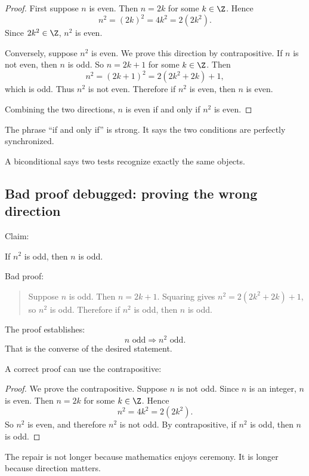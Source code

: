 \begin{proof}
First suppose $n$ is even. Then $n=2k$ for some $k\in\Z$. Hence
\[
n^2=(2k)^2=4k^2=2(2k^2).
\]
Since $2k^2\in\Z$, $n^2$ is even.

Conversely, suppose $n^2$ is even. We prove this direction by contrapositive. If $n$ is not even, then $n$ is odd. So $n=2k+1$ for some $k\in\Z$. Then
\[
n^2=(2k+1)^2=2(2k^2+2k)+1,
\]
which is odd. Thus $n^2$ is not even. Therefore if $n^2$ is even, then $n$ is even.

Combining the two directions, $n$ is even if and only if $n^2$ is even.
\end{proof}

The phrase ``if and only if'' is strong. It says the two conditions are perfectly synchronized.

\begin{intuitionbox}
A biconditional says two tests recognize exactly the same objects.
\end{intuitionbox}

\subsection{Bad proof debugged: proving the wrong direction}

Claim:

\begin{theorem}
If $n^2$ is odd, then $n$ is odd.
\end{theorem}

Bad proof:

\begin{quote}
Suppose $n$ is odd. Then $n=2k+1$. Squaring gives $n^2=2(2k^2+2k)+1$, so $n^2$ is odd. Therefore if $n^2$ is odd, then $n$ is odd.
\end{quote}

The proof establishes:
\[
n\text{ odd}\Rightarrow n^2\text{ odd}.
\]
That is the converse of the desired statement.

A correct proof can use the contrapositive:

\begin{proof}
We prove the contrapositive. Suppose $n$ is not odd. Since $n$ is an integer, $n$ is even. Then $n=2k$ for some $k\in\Z$. Hence
\[
n^2=4k^2=2(2k^2).
\]
So $n^2$ is even, and therefore $n^2$ is not odd. By contrapositive, if $n^2$ is odd, then $n$ is odd.
\end{proof}

The repair is not longer because mathematics enjoys ceremony. It is longer because direction matters.

